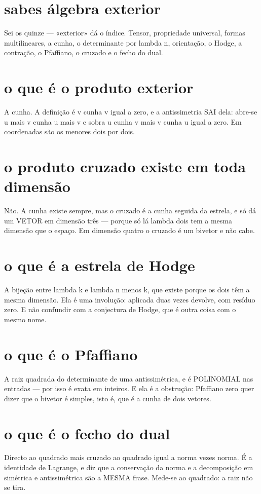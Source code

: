 \documentclass[11pt,a4paper]{article}
\begin{document}
\section{sabes álgebra exterior}
Sei os quinze --- «exterior» dá o índice. Tensor, propriedade universal, formas
multilineares, a cunha, o determinante por lambda n, orientação, o Hodge, a contração,
o Pfaffiano, o cruzado e o fecho do dual.

\section{o que é o produto exterior}
A cunha. A definição é v cunha v igual a zero, e a antissimetria SAI dela: abre-se
u mais v cunha u mais v e sobra u cunha v mais v cunha u igual a zero. Em coordenadas
são os menores dois por dois.

\section{o produto cruzado existe em toda dimensão}
Não. A cunha existe sempre, mas o cruzado é a cunha seguida da estrela, e só dá um
VETOR em dimensão três --- porque só lá lambda dois tem a mesma dimensão que o espaço.
Em dimensão quatro o cruzado é um bivetor e não cabe.

\section{o que é a estrela de Hodge}
A bijeção entre lambda k e lambda n menos k, que existe porque os dois têm a mesma
dimensão. Ela é uma involução: aplicada duas vezes devolve, com resíduo zero. E não
confundir com a conjectura de Hodge, que é outra coisa com o mesmo nome.

\section{o que é o Pfaffiano}
A raiz quadrada do determinante de uma antissimétrica, e é POLINOMIAL nas entradas ---
por isso é exata em inteiros. E ela é a obstrução: Pfaffiano zero quer dizer que o
bivetor é simples, isto é, que é a cunha de dois vetores.

\section{o que é o fecho do dual}
Directo ao quadrado mais cruzado ao quadrado igual a norma vezes norma. É a identidade
de Lagrange, e diz que a conservação da norma e a decomposição em simétrica e
antissimétrica são a MESMA frase. Mede-se ao quadrado: a raiz não se tira.
\end{document}
